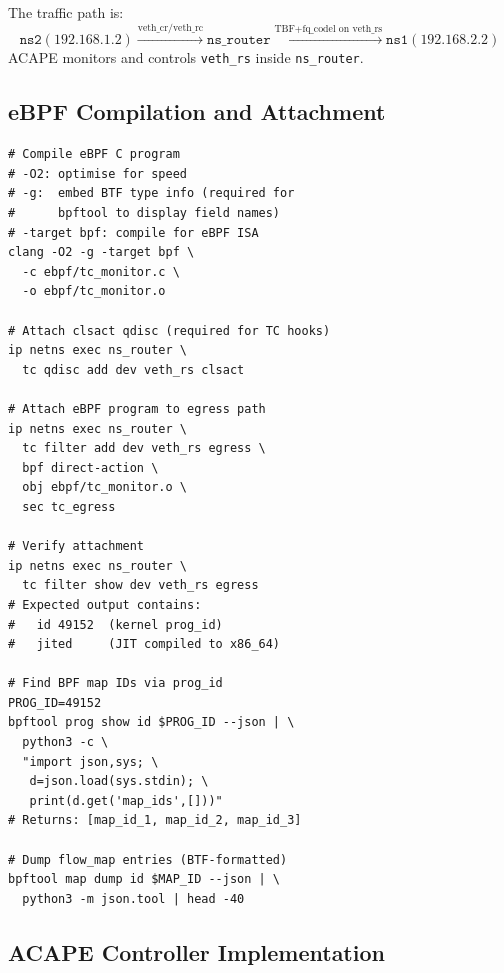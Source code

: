 \documentclass[conference]{IEEEtran}
\begin{document}
The traffic path is:
\[
\texttt{ns2}(192.168.1.2) \xrightarrow{\text{veth\_cr/veth\_rc}}
\texttt{ns\_router} \xrightarrow{\text{TBF+fq\_codel on veth\_rs}}
\texttt{ns1}(192.168.2.2)
\]
ACAPE monitors and controls \texttt{veth\_rs} inside \texttt{ns\_router}.

\subsection{eBPF Compilation and Attachment}

\begin{lstlisting}[caption=eBPF TC hook: compile attach and verify]
# Compile eBPF C program
# -O2: optimise for speed
# -g:  embed BTF type info (required for
#      bpftool to display field names)
# -target bpf: compile for eBPF ISA
clang -O2 -g -target bpf \
  -c ebpf/tc_monitor.c \
  -o ebpf/tc_monitor.o

# Attach clsact qdisc (required for TC hooks)
ip netns exec ns_router \
  tc qdisc add dev veth_rs clsact

# Attach eBPF program to egress path
ip netns exec ns_router \
  tc filter add dev veth_rs egress \
  bpf direct-action \
  obj ebpf/tc_monitor.o \
  sec tc_egress

# Verify attachment
ip netns exec ns_router \
  tc filter show dev veth_rs egress
# Expected output contains:
#   id 49152  (kernel prog_id)
#   jited     (JIT compiled to x86_64)

# Find BPF map IDs via prog_id
PROG_ID=49152
bpftool prog show id $PROG_ID --json | \
  python3 -c \
  "import json,sys; \
   d=json.load(sys.stdin); \
   print(d.get('map_ids',[]))"
# Returns: [map_id_1, map_id_2, map_id_3]

# Dump flow_map entries (BTF-formatted)
bpftool map dump id $MAP_ID --json | \
  python3 -m json.tool | head -40
\end{lstlisting}

\subsection{ACAPE Controller Implementation}
\end{document}
